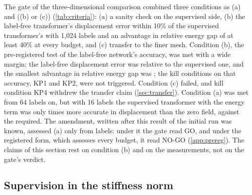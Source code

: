 The gate of the three-dimensional comparison combined three conditions as (a) and ((b) or
(c)) (\cref{tab:criteria}): (a) a sanity check on the supervised side, (b) the label-free
transformer's displacement error within 10\% of the supervised transformer's with 1,024
labels and an advantage in relative energy gap of at least 40\% at every budget, and (c)
transfer to the finer mesh. Condition (b), the pre-registered test of the label-free
network's accuracy, was met with a wide margin: the label-free displacement error was
\numGTwoParity{} relative to the supervised one, and the smallest advantage in relative
energy gap was \numGTwoAdvMin{}; the kill conditions on that accuracy, KP1 and KP2, were not
triggered. Condition (c) failed, and kill condition KP4 withdrew the transfer claim
(\cref{sec:transfer}). Condition (a) was met from 64 labels on, but with 16 labels the
supervised transformer with the energy term was only \numGTwoSanitySixteen{} times more
accurate in displacement than the zero field, against the \numGTwoSanityX{} required. The
amendment, written after this result of the initial run was known, assessed (a) only from
\numGTwoFloor{} labels: under it the gate read GO, and under the registered form, which
assesses every budget, it read NO-GO (\ref{app:prereg}). The claims of this section rest on
condition (b) and on the measurements, not on the gate's verdict.

\subsection{Supervision in the stiffness norm}\label{sec:results3d:norm}




